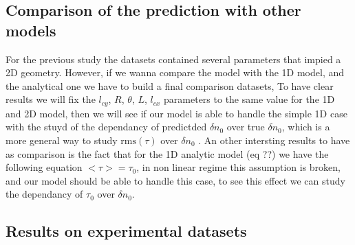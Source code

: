 \documentclass[11pt,a4paper,openany]{report}
\begin{document}
\begin{multicols}{2}

    \subsection{Comparison of the prediction with other models}
    For the previous study the datasets contained several parameters that impied a 2D geometry. However, if we wanna compare the model with the 1D model, and the analytical one we have to build a final comparison datasets, To have clear results we will fix the $l_{cy}$, $R$, $\theta$, $L$, $l_{cx}$ parameters to the same value for the 1D and 2D model, then we will see if our model is able to handle the simple 1D case with the stuyd of the dependancy of predictded $\delta n_0$ over true $\delta n_0$, which is a more general way to study $\text{rms}(\tau)$ over $\delta n_0$ . An other intersting results to have as comparison is the fact that for the 1D analytic model (eq ??) we have the following equation $< \tau > = \tau_0$, in non linear regime this assumption is broken, and our model should be able to handle this case, to see this effect we can study the dependancy of $\tau_0$ over $\delta n_0$.

    \subsection{Results on experimental datasets}
\end{multicols}
\newpage
\begin{multicols}{2}
    \newpage
    \nocite{*}
    \printbibliography
\end{multicols}
\end{document}
